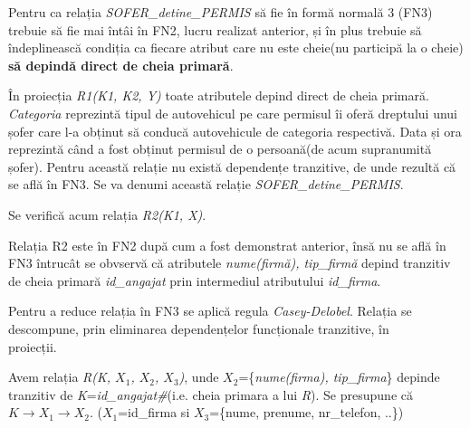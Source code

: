 \documentclass[12pt, a4paper]{article}
\begin{document}
Pentru ca relația \emph{SOFER\_detine\_PERMIS} să fie în formă normală 3 (FN3) trebuie să fie mai întâi în FN2, lucru realizat anterior, și în plus trebuie să îndeplinească condiția ca fiecare atribut care nu este cheie(nu participă la o cheie) \textbf{să depindă direct de cheia primară}.

În proiecția \emph{R1(K1, K2, Y)} toate atributele depind direct de cheia primară. \emph{Categoria} reprezintă tipul de autovehicul pe care permisul îi oferă dreptului unui șofer care l-a obținut să conducă autovehicule de categoria respectivă. Data și ora reprezintă când a fost obținut permisul de o persoană(de acum supranumită șofer). Pentru această relație nu există dependențe tranzitive, de unde rezultă că se află în FN3. Se va denumi această relație \emph{SOFER\_detine\_PERMIS}.

Se verifică acum relația \emph{R2(K1, X)}.

\begin{table}[!htbp]
\begin{center}
\caption{Relația \emph{R2(K1, X)}}\label{tab5}
\end{center}
\end{table}

Relația R2 este în FN2 după cum a fost demonstrat anterior, însă nu se află în FN3 întrucât se obvservă că atributele \emph{nume(firmă), tip\_firmă} depind tranzitiv de cheia primară \emph{id\_angajat} prin intermediul atributului \emph{id\_firma}.

Pentru a reduce relația în FN3 se aplică regula \emph{Casey-Delobel}. Relația se descompune, prin eliminarea dependențelor funcționale tranzitive, în \\proiecții.

Avem relația \emph{R(K, $X_1$, $X_2$, $X_3$)}, unde $X_2$=\{\emph{nume(firma), tip\_firma}\} depinde tranzitiv de \emph{K}=\emph{id\_angajat\#}(i.e. cheia primara a lui \emph{R}). Se presupune că $K\rightarrow X_1\rightarrow X_2$. ($X_1$=id\_firma si $X_3$=\{nume, prenume, nr\_telefon, ..\})
\end{document}
